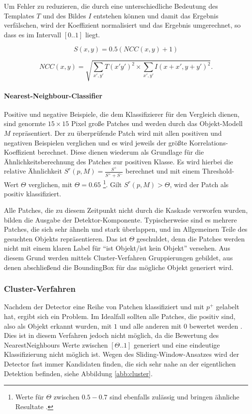 	Um Fehler zu reduzieren, die durch eine unterschiedliche Bedeutung des Templates $T$ und des Bildes $I$ entstehen können und damit das Ergebnis verfälschen, wird der Koeffizient normalisiert und das Ergebnis umgerechnet, so dass es im Intervall $[0..1]$ liegt.

	\begin{equation}
	S(x,y)=0.5(NCC(x,y)+1)
	\end{equation}

	\begin{equation}
	NCC(x,y)=\sqrt{\underset{x',y'}{\sum}T(x'y')^{2}\times\underset{x',y'}{\sum}I(x+x',y+y')^{2}}.
	\end{equation}

	\paragraph{Nearest-Neighbour-Classifier}
	Positive und negative Beispiele, die dem Klassifizierer für den Vergleich dienen, sind genormte $15\times15$ Pixel große Patches und werden	durch das Objekt-Modell $M$ repräsentiert. Der zu überprüfende Patch wird mit allen positiven und negativen Beispielen verglichen und es wird jeweils der größte Korrelations-Koeffizient berechnet. Diese dienen wiederum als Grundlage für die Ähnlichkeitsberechnung des Patches zur positiven Klasse. Es wird hierbei die relative Ähnlichkeit $S^{r}(p,M)=\frac{S^{+}}{S^{+}+S^{-}}$	berechnet und mit einem Threshold-Wert $\Theta$ verglichen, mit $\Theta=0.65$	\footnote{Werte für $\Theta$ zwischen $0.5-0.7$ sind ebenfalls zulässig und	bringen ähnliche Resultate \cite{TLD}. }. Gilt $S^{r}(p,M)>\Theta$, wird der Patch als positiv klassifiziert.

	Alle Patches, die zu diesem Zeitpunkt nicht durch die Kaskade verworfen wurden, bilden die Ausgabe der Detektor-Komponente. Typischerweise sind es mehrere Patches, die sich sehr ähneln und stark überlappen, und im Allgemeinen Teile des gesuchten Objekts repräsentieren. Das ist $\Theta$ geschuldet, denn die Patches werden nicht mit einem klaren Label für ``ist Objekt/ist kein Objekt'' versehen. Aus diesem Grund werden mittels Cluster-Verfahren Gruppierungen gebildet, aus denen abschließend die BoundingBox für das mögliche Objekt generiert wird.


	\subsubsection{Cluster-Verfahren}
	Nachdem der Detector eine Reihe von Patchen klassifiziert und mit	$p^{+}$ gelabelt hat, ergibt sich ein Problem. Im Idealfall sollten	alle Patches, die positiv sind, also als Objekt erkannt wurden, mit $1$ und alle anderen mit $0$ bewertet werden \cite{BAB}. Dies ist in diesem Verfahren jedoch nicht möglich, da die Bewertung des NearestNeighbours	Werte zwischen $[\Theta..1]$ generiert und eine eindeutige Klassifizierung nicht möglich ist. Wegen des Sliding-Window-Ansatzes wird der Detector	fast immer Kandidaten finden, die sich sehr nahe an der eigentlichen Detektion befinden, siehe Abbildung \ref{abb:cluster}.

